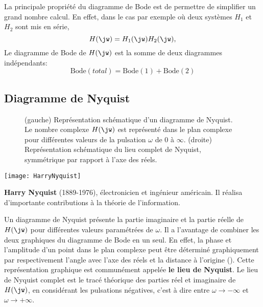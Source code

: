 La principale propriété du diagramme de Bode est de permettre de 
simplifier un grand nombre calcul. En effet, dans le cas par exemple où 
deux systèmes $H_1$ et $H_2$ sont mis en série,
\[
H(\jw)=H_1(\jw)H_2(\jw),
\]
Le diagramme de Bode de $H(\jw)$ est la somme de deux diagrammes indépendants:
\[
\mathrm{Bode}(total)=\mathrm{Bode}(1)+\mathrm{Bode}(2)
\]
\subsection{Diagramme de Nyquist}
\begin{figure}[!b]
    \centering
    
    
    \caption{(gauche) Représentation schématique d'un diagramme de Nyquist. 
             Le nombre complexe $H(\jw)$ est représenté dans le plan 
             complexe pour différentes valeurs de la pulsation $\omega$ de 
             0 à $\infty$. (droite) Représentation schématique du lieu 
             complet de Nyquist, symmétrique par rapport à l'axe des réels.
             \label{fig-sche_nyquist}}
\end{figure}
\begin{marginfigure}[2em]
    \centering
    \texttt{[image: HarryNyquist]} 
    \caption*{\textbf{Harry Nyquist} (1889-1976), 
              électronicien et ingénieur américain. Il réalisa d'importante 
              contributions à la théorie de l'information.}
\end{marginfigure}
Un diagramme de Nyquist présente la partie imaginaire et la partie 
réelle de $H(\jw)$ pour différentes 
valeurs paramétrées de $\omega$. Il a l'avantage de combiner les deux 
graphiques du diagramme de Bode en un seul. En effet, la phase et l'amplitude 
d'un point dans le plan complexe peut être déterminé graphiquement par 
respectivement l'angle avec l'axe des réels et la distance à l'origine 
(). Cette représentation graphique est communément appelée 
\textbf{le lieu de Nyquist}. Le lieu de Nyquist complet est le tracé théorique 
des parties réel et imaginaire de $H(\jw)$, en considérant les pulsations 
négatives, c'est à dire entre $\omega\rightarrow-\infty$ et 
$\omega\rightarrow+\infty$.
